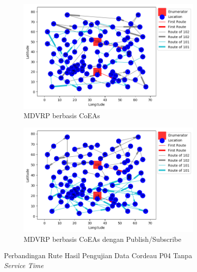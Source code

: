 \begin{figure}[!]
	\centering
	\begin{subfigure}[t]{\textwidth}
		\centering
		\includegraphics[width=\textwidth]{Resources/Images/test_result_cordeau_p04_notw_coes}
		\caption{MDVRP berbasis CoEAs}
		\label{fig:test_result_cordeau_p04_notw_coes}
	\end{subfigure}%
	
	\begin{subfigure}[t]{\textwidth}
		\centering
		\includegraphics[width=\textwidth]{Resources/Images/test_result_cordeau_p04_notw_pubsub_coes}
		\caption{MDVRP berbasis CoEAs dengan Publish/Subscribe}
		\label{fig:test_result_cordeau_p04_notw_pubsub_coes}
	\end{subfigure}
	\caption{Perbandingan Rute Hasil Pengujian Data Cordeau P04 Tanpa \textit{Service Time}}
	\label{fig:test_result_cordeau_p04_notw}
\end{figure}


